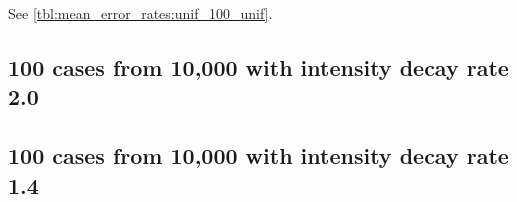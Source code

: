 See \autoref{tbl:mean_error_rates:unif_100_unif}.

\begin{table}[H]
\centering
\scriptsize

    \begin{subtable}{0.5\textwidth}
    
    \caption[]{Means} 
    \end{subtable}%
    \begin{subtable}{0.5\textwidth}
    
    \caption[]{Standard deviations} 
    \end{subtable}

\caption[]{Error rates for uniform population of 10,000, single peak intensity of factor 100 and no decay (uniform)}
\label{tbl:mean_error_rates:unif_100_unif:2}
\end{table}

\subsection{100 cases from 10,000 with intensity decay rate 2.0}
\begin{table}[H]
\centering
\scriptsize

    \begin{subtable}{0.5\textwidth}
    
    \caption[]{Means} 
    \end{subtable}%
    \begin{subtable}{0.5\textwidth}
    
    \caption[]{Standard deviations} 
    \end{subtable}

\caption[]{Error rates for uniform population of 10,000, single peak intensity of factor 100 and decay rate 2.0}
\label{tbl:mean_error_rates:unif_100_2_1h}
\end{table}

\subsection{100 cases from 10,000 with intensity decay rate 1.4}
\begin{table}[H]
\centering
\scriptsize

    \begin{subtable}{0.5\textwidth}
    
    \caption[]{Means} 
    \end{subtable}%
    \begin{subtable}{0.5\textwidth}
    
    \caption[]{Standard deviations} 
    \end{subtable}

\caption[]{Error rates for uniform population of 10,000, single peak intensity of factor 100 and decay rate 1.4}
\label{tbl:mean_error_rates:unif_100_1.4_1h}
\end{table}

